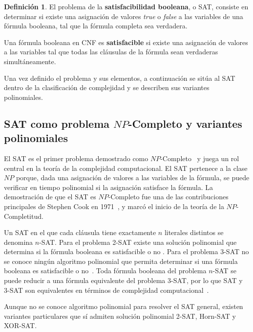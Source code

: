 \documentclass{report}
\theoremstyle{definition}
\newtheorem{definicion}{Definición}[chapter]
\theoremstyle{plain}
\theoremstyle{remark}
\begin{document}
\begin{definicion}
El problema de la \textbf{satisfacibilidad booleana}, o SAT, consiste
en determinar si existe una asignación de valores \textit{true} o
\textit{false} a las variables de una fórmula booleana, tal que la
fórmula completa sea verdadera.
\end{definicion}

Una fórmula booleana en CNF es \textbf{satisfacible} si existe una
asignación de valores a las variables tal que todas las cláusulas de la
fórmula sean verdaderas simultáneamente.

Una vez definido el problema y sus elementos, a continuación se sitúa
al SAT dentro de la clasificación de complejidad y se describen sus
variantes polinomiales.

\subsection{SAT como problema $NP$-Completo y variantes polinomiales}
\label{sec:sat-variantes}

El SAT es el primer problema demostrado como
$NP$-Completo~\cite{hopcroft2006introduction} y juega un rol central en
la teoría de la complejidad computacional. El SAT pertenece a la clase
$NP$ porque, dada una asignación de valores a las variables de la
fórmula, se puede verificar en tiempo polinomial si la asignación
satisface la fórmula. La demostración de que el SAT es $NP$-Completo
fue una de las contribuciones principales de Stephen Cook en
1971~\cite{cook1971complexity}, y marcó el inicio de la teoría de la
$NP$-Completitud.

Un SAT en el que cada cláusula tiene exactamente $n$ literales distintos
se denomina $n$-SAT. Para el problema 2-SAT existe una solución
polinomial que determina si la fórmula booleana es satisfacible o no
\cite{halim2013cp3}. Para el problema 3-SAT no se conoce ningún
algoritmo polinomial que permita determinar si una fórmula booleana es
satisfacible o no~\cite{hopcroft2006introduction}. Toda fórmula booleana
del problema $n$-SAT se puede reducir a una fórmula equivalente del
problema 3-SAT, por lo que SAT y 3-SAT son equivalentes en términos de
complejidad computacional~\cite{hopcroft2006introduction}.

Aunque no se conoce algoritmo polinomial para resolver el SAT general,
existen variantes particulares que sí admiten solución polinomial 2-SAT, Horn-SAT y XOR-SAT.
\end{document}
